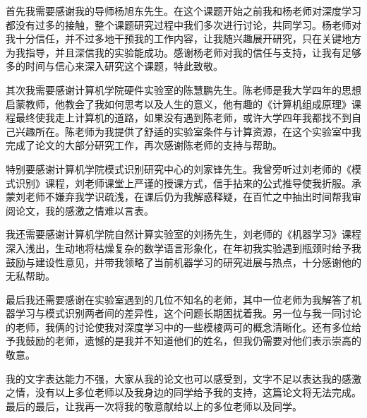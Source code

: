 

首先我需要感谢我的导师杨旭东先生。在这个课题开始之前我和杨老师对深度学习都没有过多的接触，整个课题研究过程中我们多次进行讨论，共同学习。杨老师对我十分信任，并不过多地干预我的工作内容，让我随兴趣展开研究，只在关键地方为我指导，并且深信我的实验能成功。感谢杨老师对我的信任与支持，让我有足够多的时间与信心来深入研究这个课题，特此致敬。

其次我需要感谢计算机学院硬件实验室的陈慧鹏先生。陈老师是我大学四年的思想启蒙教师，他教会了我如何思考以及人生的意义，他有趣的《计算机组成原理》课程最终使我走上计算机的道路，如果没有遇到陈老师，或许大学四年我都找不到自己兴趣所在。陈老师为我提供了舒适的实验室条件与计算资源，在这个实验室中我完成了论文的大部分研究工作，再次感谢陈老师的支持与帮助。

特别要感谢计算机学院模式识别研究中心的刘家锋先生。我曾旁听过刘老师的《模式识别》课程，刘老师课堂上严谨的授课方式，信手拈来的公式推导使我折服。承蒙刘老师不嫌弃我学识疏浅，在课后仍为我解惑释疑，在百忙之中抽出时间帮我审阅论文，我的感激之情难以言表。

我还需要感谢计算机学院自然计算实验室的刘扬先生，刘老师的《机器学习》课程深入浅出，生动地将枯燥复杂的数学语言形象化，在年初我实验遇到瓶颈时给予我鼓励与建设性意见，并带我领略了当前机器学习的研究进展与热点，十分感谢他的无私帮助。

最后我还需要感谢在实验室遇到的几位不知名的老师，其中一位老师为我解答了机器学习与模式识别两者间的差异性，这个问题长期困扰着我。另一位与我一同讨论的老师，我俩的讨论使我对深度学习中的一些模棱两可的概念清晰化。还有多位给予我鼓励的老师，遗憾的是我并不知道他们的姓名，但我仍需要对他们表示崇高的敬意。

我的文字表达能力不强，大家从我的论文也可以感受到，文字不足以表达我的感激之情，没有以上多位老师以及我身边的同学给予我的支持，这篇论文将无法完成。最后的最后，让我再一次将我的敬意献给以上的多位老师以及同学。
